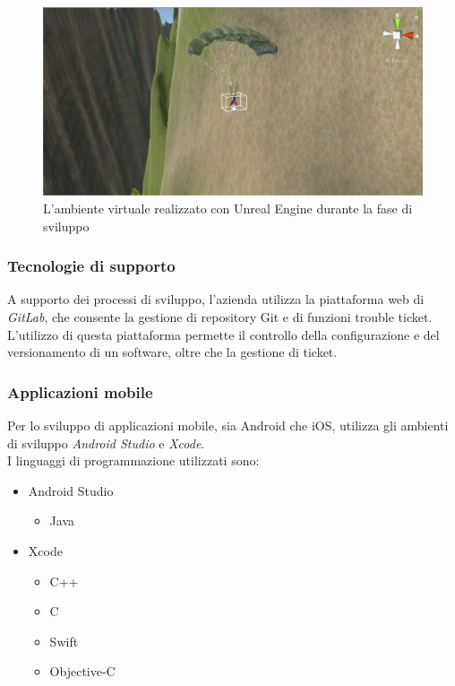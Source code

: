 \begin{figure}[H]
	\begin{center}
	\includegraphics[scale=0.25]{immagini/unity.png}
	\caption{L'ambiente virtuale realizzato con Unreal Engine durante la fase di sviluppo}
	\end{center}
\end{figure}

\subsubsection{Tecnologie di supporto}
A supporto dei processi di sviluppo, l'azienda utilizza la piattaforma web di \textit{GitLab}, che consente la gestione di repository Git e di funzioni trouble ticket.\\
L'utilizzo di questa piattaforma permette il controllo della configurazione e del versionamento di un software, oltre che la gestione di ticket.

\subsubsection{Applicazioni mobile}
Per lo sviluppo di applicazioni mobile, sia Android che iOS, \lab{} utilizza gli ambienti di sviluppo \textit{Android Studio} e \textit{Xcode}.
\\I linguaggi di programmazione utilizzati sono:
\begin{itemize}
\item Android Studio
	\begin{itemize}
		\item Java
	\end{itemize}
\item Xcode
	\begin{itemize}
		\item C++
		\item C
		\item Swift
		\item Objective-C
	\end{itemize}
\end{itemize}

